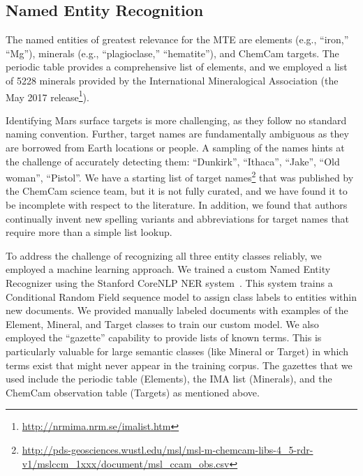 \documentclass[letterpaper]{article} %
\begin{document}
\subsection{Named Entity Recognition}

The named entities of greatest relevance for the MTE are elements
(e.g., ``iron,'' ``Mg''), minerals (e.g., ``plagioclase,''
``hematite''), and ChemCam targets.  The periodic table provides a
comprehensive list of elements, and we employed a list of 5228
minerals provided by the International Mineralogical Association (the
May 2017 release\footnote{\url{http://nrmima.nrm.se/imalist.htm}}). 

Identifying Mars surface targets is more challenging, as they follow
no standard naming convention.  Further, target names are
fundamentally ambiguous as they are borrowed from Earth locations or
people.  A sampling of the names hints at the challenge of accurately
detecting them: ``Dunkirk'', ``Ithaca'', ``Jake'', ``Old woman'',
``Pistol''.  We have a starting list of target
names\footnote{\url{http://pds-geosciences.wustl.edu/msl/msl-m-chemcam-libs-4_5-rdr-v1/mslccm_1xxx/document/msl_ccam_obs.csv}}
that was published by the ChemCam science team, but it is not fully
curated, and we have found it to be incomplete with respect to the
literature.
%
In addition, we found that authors continually invent new spelling
variants and abbreviations for target names that require more than a
simple list lookup.

To address the challenge of recognizing all three entity classes
reliably, we employed a machine learning approach.  We trained a
custom Named Entity Recognizer using the Stanford CoreNLP NER
system~\cite{finkel:ner05}.  This system trains a Conditional Random
Field sequence model to assign class labels to entities within new
documents.  We provided manually labeled documents with examples of
the Element, Mineral, and Target classes to train our custom
model.  We also employed the ``gazette'' capability to provide lists
of known terms.  This is particularly valuable for large semantic
classes (like Mineral or Target) in which terms exist that might never
appear in the training corpus.  The gazettes that we used include the
periodic table (Elements), the IMA list (Minerals), and the ChemCam
observation table (Targets) as mentioned above.

\end{document}

